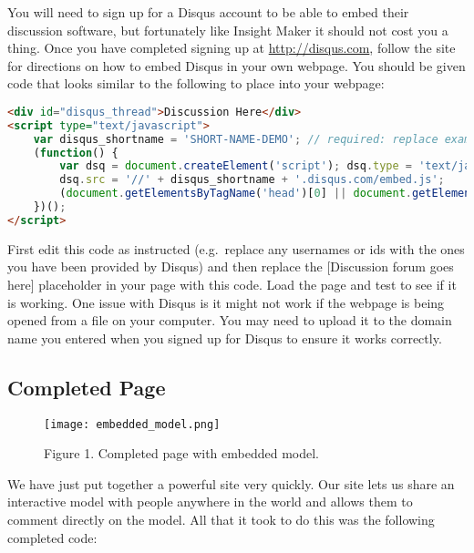 \documentclass[]{memoir}
\let\Oldincludegraphics\includegraphics
\renewcommand{\includegraphics}[1]{\Oldincludegraphics[max size={\textwidth}{\textheight}]{#1}}
\begin{document}
You will need to sign up for a Disqus account to be able to embed their
discussion software, but fortunately like Insight Maker it should not
cost you a thing. Once you have completed signing up at
\url{http://disqus.com}, follow the site for directions on how to embed
Disqus in your own webpage. You should be given code that looks similar
to the following to place into your webpage:

\begin{lstlisting}[language=HTML]
<div id="disqus_thread">Discussion Here</div>
<script type="text/javascript">
    var disqus_shortname = 'SHORT-NAME-DEMO'; // required: replace example with your forum shortname
    (function() {
        var dsq = document.createElement('script'); dsq.type = 'text/javascript'; dsq.async = true;
        dsq.src = '//' + disqus_shortname + '.disqus.com/embed.js';
        (document.getElementsByTagName('head')[0] || document.getElementsByTagName('body')[0]).appendChild(dsq);
    })();
</script>   
\end{lstlisting}

First edit this code as instructed (e.g.~replace any usernames or ids
with the ones you have been provided by Disqus) and then replace the
{[}Discussion forum goes here{]} placeholder in your page with this
code. Load the page and test to see if it is working. One issue with
Disqus is it might not work if the webpage is being opened from a file
on your computer. You may need to upload it to the domain name you
entered when you signed up for Disqus to ensure it works correctly.

\subsection{Completed Page}

\begin{figure}[htbp]
\centering
\texttt{[image: embedded\_model.png]}
\caption{Figure 1. Completed page with embedded model.}
\end{figure}

We have just put together a powerful site very quickly. Our site lets us
share an interactive model with people anywhere in the world and allows
them to comment directly on the model. All that it took to do this was
the following completed code:
\end{document}
